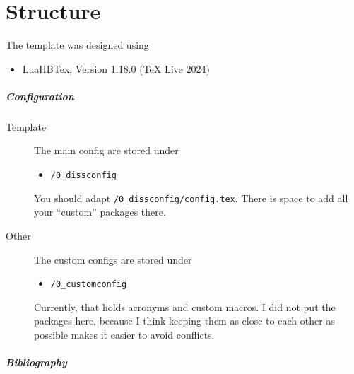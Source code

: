 

\chapter{Structure}

The template was designed using 

\begin{itemize}
	\item LuaHBTex, Version 1.18.0 (TeX Live 2024)
\end{itemize}

\paragraph{Configuration}

\begin{description}
	\item[Template] The main config are stored under 
	\begin{itemize}
	 	\item \lstinline{/0_dissconfig}
	 \end{itemize} 
	 You should adapt \lstinline{/0_dissconfig/config.tex}. There is space to add all your ``custom'' packages there.
	 \item[Other] The custom configs are stored under 
	 \begin{itemize}
	 	\item \lstinline{/0_customconfig}
	 \end{itemize} 
	 Currently, that holds acronyms and custom macros. I did not put the packages here, because I think keeping them as close to each other as possible makes it easier to avoid conflicts.
\end{description}





\paragraph{Bibliography}

